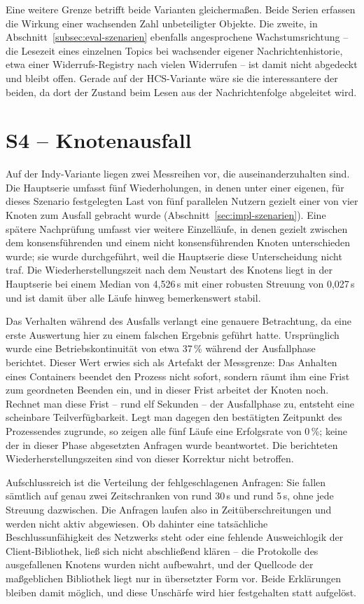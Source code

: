Eine weitere Grenze betrifft beide Varianten gleichermaßen. Beide Serien erfassen die Wirkung einer wachsenden Zahl unbeteiligter Objekte. Die zweite, in Abschnitt~\ref{subsec:eval-szenarien} ebenfalls angesprochene Wachstumsrichtung -- die Lesezeit eines einzelnen Topics bei wachsender eigener Nachrichtenhistorie, etwa einer Widerrufs-Registry nach vielen Widerrufen -- ist damit nicht abgedeckt und bleibt offen. Gerade auf der HCS-Variante wäre sie die interessantere der beiden, da dort der Zustand beim Lesen aus der Nachrichtenfolge abgeleitet wird.

\section{S4 -- Knotenausfall}
\label{sec:results-s4}

Auf der Indy-Variante liegen zwei Messreihen vor, die auseinanderzuhalten sind. Die Hauptserie umfasst fünf Wiederholungen, in denen unter einer eigenen, für dieses Szenario festgelegten Last von fünf parallelen Nutzern gezielt einer von vier Knoten zum Ausfall gebracht wurde (Abschnitt~\ref{sec:impl-szenarien}). Eine spätere Nachprüfung umfasst vier weitere Einzelläufe, in denen gezielt zwischen dem konsensführenden und einem nicht konsensführenden Knoten unterschieden wurde; sie wurde durchgeführt, weil die Hauptserie diese Unterscheidung nicht traf. Die Wiederherstellungszeit nach dem Neustart des Knotens liegt in der Hauptserie bei einem Median von 4,526\,s mit einer robusten Streuung von 0,027\,s und ist damit über alle Läufe hinweg bemerkenswert stabil.

Das Verhalten während des Ausfalls verlangt eine genauere Betrachtung, da eine erste Auswertung hier zu einem falschen Ergebnis geführt hatte. Ursprünglich wurde eine Betriebskontinuität von etwa 37\,\% während der Ausfallphase berichtet. Dieser Wert erwies sich als Artefakt der Messgrenze: Das Anhalten eines Containers beendet den Prozess nicht sofort, sondern räumt ihm eine Frist zum geordneten Beenden ein, und in dieser Frist arbeitet der Knoten noch. Rechnet man diese Frist -- rund elf Sekunden -- der Ausfallphase zu, entsteht eine scheinbare Teilverfügbarkeit. Legt man dagegen den bestätigten Zeitpunkt des Prozessendes zugrunde, so zeigen alle fünf Läufe eine Erfolgsrate von 0\,\%; keine der in dieser Phase abgesetzten Anfragen wurde beantwortet. Die berichteten Wiederherstellungszeiten sind von dieser Korrektur nicht betroffen.

Aufschlussreich ist die Verteilung der fehlgeschlagenen Anfragen: Sie fallen sämtlich auf genau zwei Zeitschranken von rund 30\,s und rund 5\,s, ohne jede Streuung dazwischen. Die Anfragen laufen also in Zeitüberschreitungen und werden nicht aktiv abgewiesen. Ob dahinter eine tatsächliche Beschlussunfähigkeit des Netzwerks steht oder eine fehlende Ausweichlogik der Client-Bibliothek, ließ sich nicht abschließend klären -- die Protokolle des ausgefallenen Knotens wurden nicht aufbewahrt, und der Quellcode der maßgeblichen Bibliothek liegt nur in übersetzter Form vor. Beide Erklärungen bleiben damit möglich, und diese Unschärfe wird hier festgehalten statt aufgelöst.

